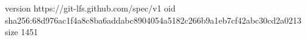 version https://git-lfs.github.com/spec/v1
oid sha256:68d976ac1f4a8c8ba6addabc8904054a5182c266b9a1eb7cf42abc30cd2a0213
size 1451
